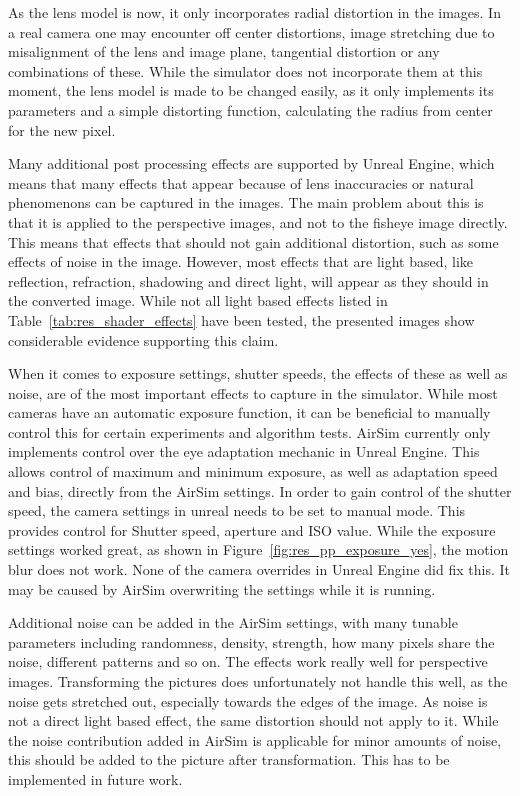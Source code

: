 As the lens model is now, it only incorporates radial distortion in the images. In a real camera one may encounter off center distortions, image stretching due to misalignment of the lens and image plane, tangential distortion or any combinations of these. While the simulator does not incorporate them at this moment, the lens model is made to be changed easily, as it only implements its parameters and a simple distorting function, calculating the radius from center for the new pixel.

Many additional post processing effects are supported by Unreal Engine, which means that many effects that appear because of lens inaccuracies or natural phenomenons can be captured in the images. The main problem about this is that it is applied to the perspective images, and not to the fisheye image directly. This means that effects that should not gain additional distortion, such as some effects of noise in the image. However, most effects that are light based, like reflection, refraction, shadowing and direct light, will appear as they should in the converted image. While not all light based effects listed in Table~\ref{tab:res_shader_effects} have been tested, the presented images show considerable evidence supporting this claim.

When it comes to exposure settings, shutter speeds, the effects of these as well as noise, are of the most important effects to capture in the simulator. While most cameras have an automatic exposure function, it can be beneficial to manually control this for certain experiments and algorithm tests. AirSim currently only implements control over the eye adaptation mechanic in Unreal Engine. This allows control of maximum and minimum exposure, as well as adaptation speed and bias, directly from the AirSim settings. In order to gain control of the shutter speed, the camera settings in unreal needs to be set to manual mode. This provides control for Shutter speed, aperture and ISO value. While the exposure settings worked great, as shown in Figure~\ref{fig:res_pp_exposure_yes}, the motion blur does not work. None of the camera overrides in Unreal Engine did fix this. It may be caused by AirSim overwriting the settings while it is running.

Additional noise can be added in the AirSim settings, with many tunable parameters including randomness, density, strength, how many pixels share the noise, different patterns and so on. The effects work really well for perspective images. Transforming the pictures does unfortunately not handle this well, as the noise gets stretched out, especially towards the edges of the image. As noise is not a direct light based effect, the same distortion should not apply to it. While the noise contribution added in AirSim is applicable for minor amounts of noise, this should be added to the picture after transformation. This has to be implemented in future work.

